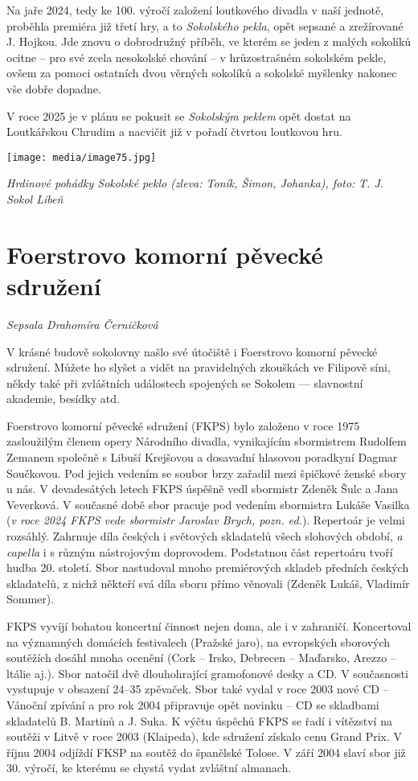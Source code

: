 Na jaře 2024, tedy ke 100. výročí založení loutkového divadla v naší
jednotě, proběhla premiéra již třetí hry, a to \emph{Sokolského pekla},
opět sepsané a zrežírované J. Hojkou. Jde znovu o dobrodružný příběh, ve
kterém se jeden z malých sokolíků ocitne -- pro své zcela nesokolské
chování -- v hrůzostrašném sokolském pekle, ovšem za pomoci ostatních
dvou věrných sokolíků a sokolské myšlenky nakonec vše dobře dopadne.

V roce 2025 je v plánu se pokusit se \emph{Sokolským peklem} opět dostat
na Loutkářskou Chrudim a nacvičit již v pořadí čtvrtou loutkovou hru.

\texttt{[image: media/image75.jpg]}

\emph{Hrdinové pohádky Sokolské peklo (zleva: Toník, Šimon, Johanka),
foto:} \emph{T. J. Sokol Libeň}

\section{Foerstrovo komorní pěvecké
sdružení}\label{foerstrovo-komornuxed-pux11bveckuxe9-sdruux17eenuxed}

\emph{Sepsala Drahomíra Černičková}

V krásné budově sokolovny našlo své útočiště i Foerstrovo komorní
pěvecké sdružení. Můžete ho slyšet a vidět na pravidelných zkouškách ve
Filipově síni, někdy také při zvláštních událostech spojených se Sokolem
--- slavnostní akademie, besídky atd.

Foerstrovo komorní pěvecké sdružení (FKPS) bylo založeno v roce 1975
zasloužilým členem opery Národního divadla, vynikajícím sbormistrem
Rudolfem Zemanem společně s Libuší Krejšovou a dosavadní hlasovou
poradkyní Dagmar Součkovou. Pod jejich vedením se soubor brzy zařadil
mezi špičkové ženské sbory u nás. V devadesátých letech FKPS úspěšně
vedl sbormistr Zdeněk Šulc a Jana Veverková. V současné době sbor
pracuje pod vedením sbormistra Lukáše Vasilka (\emph{v roce 2024 FKPS
vede sbormistr Jaroslav Brych, pozn. ed.}). Repertoár je velmi rozsáhlý.
Zahrnuje díla českých i světových skladatelů všech slohových období,
\emph{a capella} i s různým nástrojovým doprovodem. Podstatnou část
repertoáru tvoří hudba 20. století. Sbor nastudoval mnoho premiérových
skladeb předních českých skladatelů, z nichž někteří svá díla sboru
přímo věnovali (Zdeněk Lukáš, Vladimír Sommer).

FKPS vyvíjí bohatou koncertní činnost nejen doma, ale i v zahraničí.
Koncertoval na významných domácích festivalech (Pražské jaro), na
evropských sborových soutěžích dosáhl mnoha ocenění (Cork -- Irsko,
Debrecen -- Maďarsko, Arezzo -- ltálie aj.). Sbor natočil dvě
dlouhohrající gramofonové desky a CD. V současnosti vystupuje v obsazení
24--35 zpěvaček. Sbor také vydal v roce 2003 nové CD -- Vánoční zpívání
a pro rok 2004 připravuje opět novinku -- CD se skladbami skladatelů B.
Martinů a J. Suka. K výčtu úspěchů FKPS se řadí i vítězství na soutěži v
Litvě v roce 2003 (Klaipeda), kde sdružení získalo cenu Grand Prix. V
říjnu 2004 odjíždí FKSP na soutěž do španělské Tolose. V září 2004 slaví
sbor již 30. výročí, ke kterému se chystá vydat zvláštní almanach.

